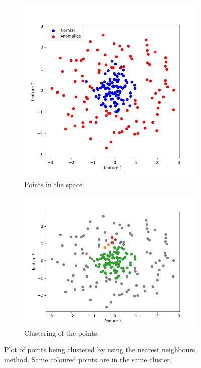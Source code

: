 \documentclass[oneside, a4paper, onecolumn, 11pt]{article}
\begin{document}
\begin{figure}[H]
  \centering
  \begin{subfigure}{0.33\textwidth}
      \centering
      \includegraphics[width=\linewidth]{images/or_class_nn_circle.png}
      \caption{Points in the space}
  \end{subfigure}
  \begin{subfigure}{0.35\textwidth}
      \centering
      \includegraphics[width=\linewidth]{images/actual_nn_circle.png}
      \caption{Clustering of the points.}
  \end{subfigure}
  \caption{Plot of points being clustered by using the nearest neighbours method. Same coloured points are in the same cluster.}
  \label{fig:nn_circle}
\end{figure}
\end{document}
